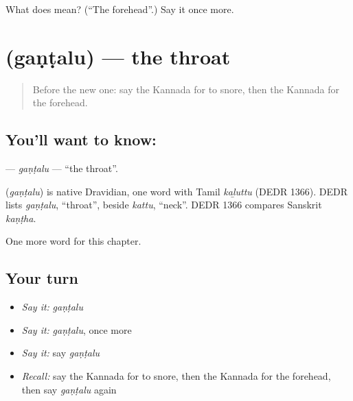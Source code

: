 \begin{tcolorbox}[breakable,colback=teal!4,colframe=teal!35!black,title={Before you move on}]
What does  mean? (\textquotedblleft{}The forehead\textquotedblright{}.) Say it once more.
\end{tcolorbox}
\section[\texorpdfstring{\kn{ಗಂಟಲು} (gaṇṭalu)}{ಗಂಟಲು (gaṇṭalu)}]{ (gaṇṭalu) — the throat}

\label{lesson:KA-C168-gantalu}



\begin{quote}
Before the new one: say the Kannada for to snore, then the Kannada for the forehead.
\end{quote}

\subsection*{You'll want to know: }
\textbf{} — \emph{gaṇṭalu} — \textquotedblleft{}the throat\textquotedblright{}.

\begin{cousinweb}
\textbf{} (\emph{gaṇṭalu}) is native Dravidian, one word with Tamil \emph{kaḻuttu} (DEDR 1366). DEDR lists \emph{gaṇṭalu}, \textquotedblleft{}throat\textquotedblright{}, beside \emph{kattu}, \textquotedblleft{}neck\textquotedblright{}. DEDR 1366 compares Sanskrit \emph{kaṇṭha}.
\end{cousinweb}

\begin{grammarlens}[title={What you've built}]
One more word for this chapter.
\end{grammarlens}

\subsection*{Your turn}
\begin{itemize}
\raggedright
  \item \emph{Say it:} \emph{gaṇṭalu}
  \item \emph{Say it:} \emph{gaṇṭalu}, once more
  \item \emph{Say it:} say \emph{gaṇṭalu}
  \item \emph{Recall:} say the Kannada for to snore, then the Kannada for the forehead, then say \emph{gaṇṭalu} again
\end{itemize}

